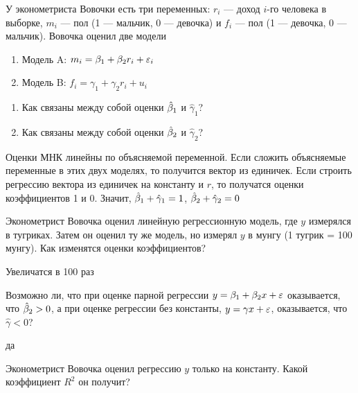 \documentclass[pdftex,11pt,openany]{book}\usepackage[]{graphicx}\usepackage[]{color}
\begin{document}
\begin{problem}
 У эконометриста Вовочки есть три переменных: $r_i$ --- доход $i$-го человека в выборке, $m_i$ --- пол (1 --- мальчик, 0 --- девочка) и $f_i$ --- пол (1 --- девочка, 0 --- мальчик). Вовочка оценил две модели
\begin{enumerate}
\item[] Модель A: $m_i=\beta_1+\beta_2 r_i+\varepsilon_i$
\item[] Модель B: $f_i=\gamma_1+\gamma_2 r_i+u_i$
\end{enumerate}
\begin{enumerate}
\item Как связаны между собой оценки $\hat{\beta}_1$ и $\hat{\gamma}_1$?
\item Как связаны между собой оценки $\hat{\beta}_2$ и $\hat{\gamma}_2$? 
\end{enumerate}
\end{problem}

\begin{solution}
 Оценки МНК линейны по объясняемой переменной. Если сложить объясняемые переменные в этих двух моделях, то получится вектор из единичек. Если строить регрессию вектора из единичек на константу и $r$, то получатся оценки коэффициентов 1 и 0. Значит, $\hat{\beta}_1+\hat{\gamma}_1=1$, $\hat{\beta}_2+\hat{\gamma}_2=0$ 
\end{solution}



\begin{problem}
 Эконометрист Вовочка оценил линейную регрессионную модель, где $y$ измерялся в тугриках. Затем он оценил ту же модель, но измерял $y$ в мунгу (1 тугрик = 100 мунгу). Как изменятся оценки коэффициентов?
\end{problem}

\begin{solution}
 Увеличатся в 100 раз
\end{solution}


\begin{problem}
 Возможно ли, что при оценке парной регрессии $y=\beta_1+\beta_2 x+\varepsilon$ оказывается, что $\hat{\beta}_2>0$, а при оценке регрессии без константы, $y=\gamma x+\varepsilon$, оказывается, что $\hat{\gamma}<0$?
\end{problem}

\begin{solution}
 да
\end{solution}



\begin{problem}
 Эконометрист Вовочка оценил регрессию $y$ только на константу. Какой коэффициент $R^2$ он получит?
\end{problem}
\end{document}
